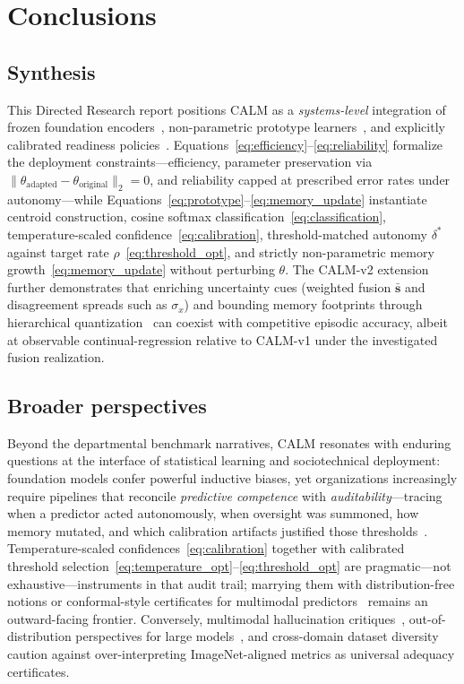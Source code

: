 \documentclass[12pt,a4paper]{report}
\begin{document}
\chapter{Conclusions}
\label{ch:con}

\section{Synthesis}
This Directed Research report positions CALM as a \emph{systems-level} integration of frozen foundation encoders~\cite{r1}, non-parametric prototype learners~\cite{r3,r4}, and explicitly calibrated readiness policies~\cite{r5,r10}. Equations~\eqref{eq:efficiency}--\eqref{eq:reliability} formalize the deployment constraints---efficiency, parameter preservation via $\|\theta_{\text{adapted}}-\theta_{\text{original}}\|_2{=}0$, and reliability capped at prescribed error rates under autonomy---while Equations~\eqref{eq:prototype}--\eqref{eq:memory_update} instantiate centroid construction, cosine softmax classification~\eqref{eq:classification}, temperature-scaled confidence~\eqref{eq:calibration}, threshold-matched autonomy $\delta^\ast$ against target rate $\rho$~\eqref{eq:threshold_opt}, and strictly non-parametric memory growth~\eqref{eq:memory_update} without perturbing $\theta$. The CALM-v2 extension further demonstrates that enriching uncertainty cues (weighted fusion $\bar{\mathbf{s}}$ and disagreement spreads such as $\sigma_x$) and bounding memory footprints through hierarchical quantization~\cite{r31,r32} can coexist with competitive episodic accuracy, albeit at observable continual-regression relative to CALM-v1 under the investigated fusion realization.

\section{Broader perspectives}
Beyond the departmental benchmark narratives, CALM resonates with enduring questions at the interface of statistical learning and sociotechnical deployment: foundation models confer powerful inductive biases, yet organizations increasingly require pipelines that reconcile \emph{predictive competence} with \emph{auditability}---tracing when a predictor acted autonomously, when oversight was summoned, how memory mutated, and which calibration artifacts justified those thresholds~\cite{r24,r10}. Temperature-scaled confidences~\eqref{eq:calibration} together with calibrated threshold selection~\eqref{eq:temperature_opt}--\eqref{eq:threshold_opt} are pragmatic---not exhaustive---instruments in that audit trail; marrying them with distribution-free notions or conformal-style certificates for multimodal predictors~\cite{r10,r21} remains an outward-facing frontier. Conversely, multimodal hallucination critiques~\cite{r23}, out-of-distribution perspectives for large models~\cite{r22}, and cross-domain dataset diversity~\cite{r28,r29,r30} caution against over-interpreting ImageNet-aligned metrics as universal adequacy certificates.
\end{document}
